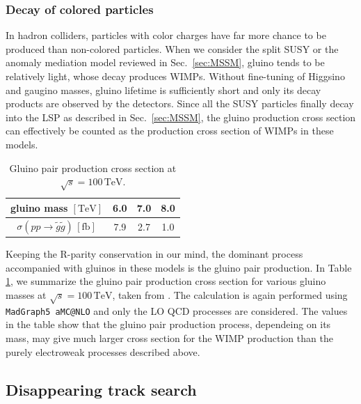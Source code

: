\documentclass[12pt,twoside,book]{article}
\begin{document}



\subsubsection*{Decay of colored particles}

In hadron colliders, particles with color charges have far more chance to be produced than non-colored particles.
When we consider the split SUSY or the anomaly mediation model reviewed in Sec.~\ref{sec:MSSM}, gluino tends to be relatively light, whose decay produces WIMPs.
Without fine-tuning of Higgsino and gaugino masses, gluino lifetime is sufficiently short and only its decay products are observed by the detectors.
Since all the SUSY particles finally decay into the LSP as described in Sec.~\ref{sec:MSSM}, the gluino production cross section can effectively be counted as the production cross section of WIMPs in these models.

\begin{table}[t]
  \centering
  \begin{tabular}{c|ccc}
    gluino mass $\mathrm{[TeV]}$ & 6.0 & 7.0 & 8.0 \\ \hline
    $\sigma(p p \to \tilde{g} \tilde{g})\, \mathrm{[fb]}$ & 7.9 & 2.7 & 1.0
  \end{tabular}
  \caption{Gluino pair production cross section at $\sqrt{s} = 100\,\mathrm{TeV}$.}
  \label{tab:gluino_pair}
\end{table}

Keeping the R-parity conservation in our mind, the dominant process accompanied with gluinos in these models is the gluino pair production.
In Table \ref{tab:gluino_pair}, we summarize the gluino pair production cross section for various gluino masses at $\sqrt{s} = 100\,\mathrm{TeV}$, taken from \cite{Asai:2019wst}.
The calculation is again performed using \texttt{MadGraph5 aMC@NLO} and only the LO QCD processes are considered.
The values in the table show that the gluino pair production process, dependeing on its mass, may give much larger cross section for the WIMP production than the purely electroweak processes described above.



\subsection{Disappearing track search}
\label{sec:disappearing_track}
\end{document}
